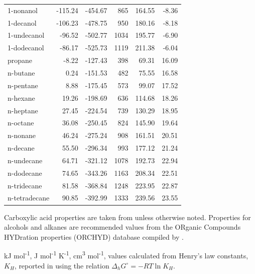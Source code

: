 {\begin{table}
\begin{adjustbox}{height=\textheight,keepaspectratio}
\begin{threeparttable}
\begin{tabular}{lrrrrr}
1-nonanol & -115.24 & -454.67 & 865   & 164.55 & -8.36 \\
1-decanol & -106.23 & -478.75 & 950   & 180.16 & -8.18 \\
1-undecanol & -96.52 & -502.77 & 1034  & 195.77 & -6.90 \\
1-dodecanol & -86.17 & -525.73 & 1119  & 211.38 & -6.04 \\
propane & -8.22 & -127.43 & 398   & 69.31 & 16.09 \\
n-butane & 0.24  & -151.53 & 482   & 75.55 & 16.58 \\
n-pentane & 8.88  & -175.45 & 573   & 99.07 & 17.52 \\
n-hexane & 19.26 & -198.69 & 636   & 114.68 & 18.26 \\
n-heptane & 27.45 & -224.54 & 739   & 130.29 & 18.95 \\
n-octane & 36.08 & -250.45 & 824   & 145.90 & 19.64 \\
n-nonane & 46.24 & -275.24 & 908   & 161.51 & 20.51 \\
n-decane & 55.50 & -296.34 & 993   & 177.12 & 21.24 \\
n-undecane & 64.71 & -321.12 & 1078  & 192.73 & 22.94 \\
n-dodecane & 74.65 & -343.26 & 1163  & 208.34 & 22.51 \\
n-tridecane & 81.58 & -368.84 & 1248  & 223.95 & 22.87 \\
n-tetradecane & 90.85 & -392.99 & 1333  & 239.56 & 23.55 \\
\bottomrule
\end{tabular}%


  
  \begin{tablenotes}
    Carboxylic acid properties are taken from \cite{shock1995organic} unless otherwise noted. Properties for alcohols and alkanes are recommended values from the ORganic Compounds HYDration properties (ORCHYD) database compiled by \cite{plyasunova2004database}.
    
     kJ mol\textsuperscript{-1},
     J mol\textsuperscript{-1} K\textsuperscript{-1},
     cm\textsuperscript{3} mol\textsuperscript{-1},
     values calculated from Henry's law constants, $K_{H}$, reported in \cite{khan1992henry} using the relation $\Delta_{h}G^{\circ} = -RT\ln{K_{H}}$.
        
  \end{tablenotes}
  
  \label{tab:carbacid_alc_alk_props}
  \end{threeparttable}
  \end{adjustbox}
\end{table}
\setcounter{tabcounter}{0} %
\doublespace
\clearpage
}


